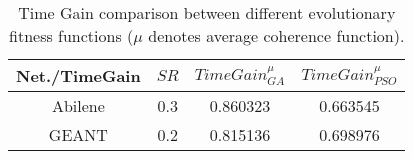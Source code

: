 \begin{table}
	\centering
 \footnotesize{
 \renewcommand{\tabcolsep}{0.05cm}
 \renewcommand{\arraystretch}{1.0}
		\begin{tabular}{| c | c | c | c |}
		\hline
       Net./TimeGain & $SR$ & $Time Gain^{\mu}_{GA}$ & $Time Gain^{\mu}_{PSO}$ \\ \hline
      Abilene    & 0.3 & 0.860323 & 0.663545  \\ \hline
      GEANT      & 0.2 & 0.815136 & 0.698976  \\ \hline
    \end{tabular}
	\caption{\scriptsize{Time Gain comparison between different evolutionary fitness functions ($\mu$ denotes average coherence function).}}
	\label{tab:FitFuncCmp2}
}
\end{table}

